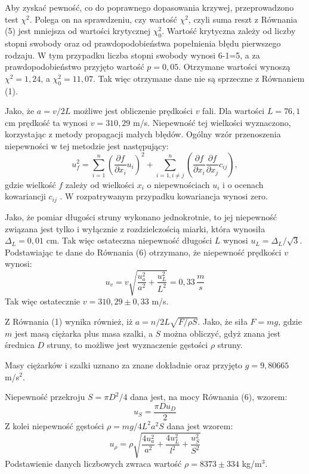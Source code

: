 \documentclass[10pt,a4paper]{article}
\begin{document}
Aby zyskać pewność, co do poprawnego dopasowania krzywej, przeprowadzono test $\chi^2$. Polega on na sprawdzeniu, czy wartość $\chi^2$, czyli suma reszt z Równania (5) jest mniejsza od wartości krytycznej $\chi_{0}^2$. Wartość krytyczna zależy od liczby stopni swobody oraz od prawdopodobieństwa popełnienia błędu pierwszego rodzaju. W tym przypadku liczba stopni swobody wynosi 6-1=5, a za prawdopodobieństwo przyjęto wartość $p=0,05$.
Otrzymane wartości wynoszą $\chi^2=1,24$, a $\chi_{0}^2=11,07$. Tak więc otrzymane dane nie są sprzeczne z Równaniem (1). 


Jako, że $a=v/2L$ możliwe jest obliczenie prędkości $v$ fali. Dla wartości $L=76,1$ cm prędkość ta wynosi $v=310,29$ m/s. Niepewność tej wielkości wyznaczono, korzystając z metody propagacji małych błędów. Ogólny wzór przenoszenia niepewności w tej metodzie jest następujący:
 \begin{equation}
 u_{f}^2=\sum_{i=1}^n \left( \dfrac{\partial f}{\partial x_{i}}u_{i}\right)^2+\sum_{i=1, i\neq j}^n \left( \dfrac{\partial f}{\partial x_{i}}\dfrac{\partial f}{\partial x_{j}}c_{ij}\right),
 \end{equation}
 gdzie wielkość $f$ zależy od wielkości $x_{i}$ o niepewnościach $u_{i}$ i o ocenach kowariancji $c_{ij}$ \cite{tay2}. W rozpatrywanym przypadku kowariancja wynosi zero.

Jako, że pomiar długości struny wykonano jednokrotnie, to jej niepewność związana jest tylko i wyłącznie z rozdzielczością miarki, która wynosiła $\Delta_{L}=0,01$ cm. Tak więc ostateczna niepewność długości $L$ wynosi $u_{L}=\Delta_{L}/\sqrt{3}$.
Podstawiając te dane do Równania (6) otrzymano, że niepewność prędkości $v$ wynosi:
\begin{equation}
u_{v}=v\sqrt{\dfrac{u_{a}^2}{a^2}+\dfrac{u_{L}^2}{L^2}}=0,33 \, \dfrac{m}{s}
\end{equation}
Tak więc ostatecznie $v=310,29\pm0,33$ m/s.

Z Równania (1) wynika również, iż $a=n/2L\sqrt{F/\rho S}$. Jako, że siła $F=mg$, gdzie $m$ jest masą ciężarka plus masa szalki, a $S$ można obliczyć, gdyż znana jest średnica $D$ struny, to możliwe jest wyznaczenie gęstości $\rho$ struny.

Masy ciężarków i szalki uznano za znane dokładnie oraz przyjęto $g=9,80665$ m/s$^2$. 

Niepewność przekroju $S=\pi D^2/4$ dana jest, na mocy Równania (6), wzorem:
\begin{equation}
u_{S}=\dfrac{\pi D u_{D}}{2}
\end{equation}
Z kolei niepewność gęstości $\rho=mg/4L^2a^2S$ dana jest wzorem:
\begin{equation}
u_{\rho}=\rho \sqrt{\dfrac{4u_{a}^2}{a^2}+\dfrac{4u_{L}^2}{l^2}+\dfrac{u_{S}^2}{S^2}}
\end{equation}
Podstawienie danych liczbowych zwraca wartość $\rho=8373\pm334$ kg/m$^3$.
\end{document}
